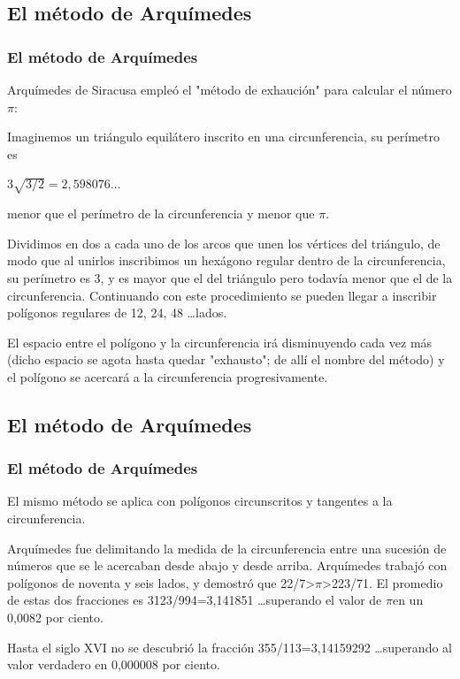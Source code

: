 \documentclass{beamer}
\newcommand{\PI}{{$\pi$}}
\begin{document}
\subsection{El método de Arquímedes}
\begin{frame}
\frametitle{El método de Arquímedes}

Arquímedes de Siracusa empleó el "método de exhaución" para calcular el número \PI:

Imaginemos un triángulo equilátero inscrito en una circunferencia, su perímetro es \centerline {3$\sqrt{3/2}= 2,598076 \dots$}
menor que el perímetro de la circunferencia y menor que \PI.

Dividimos en dos a cada uno de los arcos que unen los vértices del triángulo, de modo que al unirlos inscribimos un hexágono regular dentro de la circunferencia, su perímetro es 3, y es mayor que el del triángulo pero todavía menor que el de la circunferencia. Continuando con este procedimiento se pueden llegar a inscribir polígonos regulares de 12, 24, 48 \dots lados.

El espacio entre el polígono y la circunferencia irá disminuyendo cada vez más (dicho espacio se agota hasta quedar "exhausto"; de allí el nombre del método) y el polígono se acercará a la circunferencia progresivamente.
\end{frame}

\subsection{El método de Arquímedes}
\begin{frame}
\frametitle{El método de Arquímedes}

El mismo método se aplica con polígonos circunscritos y tangentes a la circunferencia.

Arquímedes fue delimitando la medida de la circunferencia entre una sucesión de números que se le acercaban desde abajo y desde arriba. Arquímedes trabajó con polígonos de noventa y seis lados, y demostró que 22/7>\PI>223/71. El promedio de estas dos fracciones es 3123/994=3,141851 \dots superando el valor de \PI en un 0,0082 por ciento.

Hasta el siglo XVI no se descubrió la fracción 355/113=3,14159292 \dots superando al valor verdadero en 0,000008 por ciento.
\end{frame}
\end{document}

